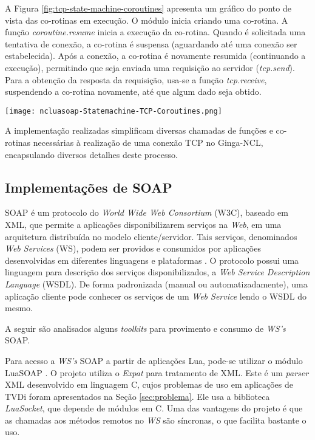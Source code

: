 A Figura \ref{fig:tcp-state-machine-coroutines} apresenta um gráfico do ponto de vista das co-rotinas em execução. 
O módulo inicia criando uma co-rotina. A função \textit{coroutine.resume}
inicia a execução da co-rotina. Quando é solicitada uma tentativa de
conexão, a co-rotina é suspensa (aguardando até uma conexão ser estabelecida).
Após a conexão, a co-rotina é novamente resumida (continuando a execução),
permitindo que seja enviada uma requisição ao servidor (\textit{tcp.send}). 
Para a obtenção da resposta da requisição,  
usa-se a função \textit{tcp.receive}, suspendendo a co-rotina
novamente, até que algum dado seja obtido.

\begin{center}
	\texttt{[image: ncluasoap-Statemachine-TCP-Coroutines.png]}
	\label{fig:tcp-state-machine-coroutines}
\end{center}

A implementação realizadas simplificam diversas chamadas de funções e co-rotinas necessárias à realização de uma conexão TCP no Ginga-NCL,
encapsulando diversos detalhes deste processo.

\subsection{Implementações de SOAP}

SOAP é um protocolo do \textit{World Wide Web Consortium} (W3C), baseado em XML, que permite a aplicações disponibilizarem serviços na \textit{Web}, em uma arquitetura distribuída no modelo cliente/servidor. 
Tais serviços, denominados \textit{Web Services} (WS), podem ser providos e consumidos por aplicações desenvolvidas em diferentes linguagens e plataformas
\cite{soap-spec} \cite{curbera2002unraveling} \cite{newcomer2002understanding}.
O protocolo possui uma linguagem para descrição dos serviços disponibilizados, a \textit{Web Service Description Language} (WSDL).
De forma padronizada (manual ou automatizadamente), uma aplicação cliente pode conhecer os serviços
de um \textit{Web Service} lendo o WSDL do mesmo\cite{soap-spec}.

A seguir são analisados alguns \textit{toolkits} para provimento e consumo de \textit{WS's} SOAP.

Para acesso a \textit{WS's} SOAP a partir de aplicações Lua, pode-se utilizar o módulo LuaSOAP \cite{luasoap}.
O projeto utiliza o \textit{Expat} \cite{expat}\cite{cooper1999using} para 
tratamento de XML. Este é um \textit{parser} XML desenvolvido em linguagem C, cujos problemas de uso
em aplicações de TVDi foram apresentados na Seção \ref{sec:problema}. Ele usa a biblioteca \textit{LuaSocket},
que depende de módulos em C. 
Uma das vantagens do projeto é que as chamadas aos métodos remotos no \textit{WS} são síncronas, o que facilita
bastante o uso.

